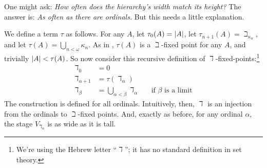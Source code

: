 \documentclass[../../../include/open-logic-section]{subfiles}
\begin{document}
One might ask: \emph{How often does the hierarchy's width match its
height?} The answer is: \emph{As often as there are ordinals.} But
this needs a little explanation. 

We define a term $\tau$ as follows. For any $A$, let $\tau_0(A) =
\left| A \right|$, let $\tau_{n+1}(A) = \beth_{\kappa_n}$, and let $\tau(A) =
\bigcup_{n < \omega}\kappa_n$. As in , $\tau(A)$ is a
$\beth$-fixed point for any $A$, and trivially $\left| A \right| < \tau(A)$.
So now consider this recursive definition of
$\daleth$-fixed-points:\footnote{We're using the Hebrew letter
``$\daleth$''; it has no standard definition in set theory.}
\begin{align*}
\daleth_0 &= 0\\
\daleth_{\alpha + 1} &= \tau(\daleth_\alpha)\\
\daleth_\beta &= \bigcup_{\alpha < \beta} \daleth_\alpha&&
\text{if $\beta$ is a limit}
\end{align*}
The construction is defined for all ordinals. Intuitively, then,
$\daleth$ is an injection from the ordinals to $\beth$-fixed points.
And, exactly as before, for any ordinal $\alpha$, the stage
$V_{\daleth_\alpha}$ is as wide as it is tall.
\end{document}
